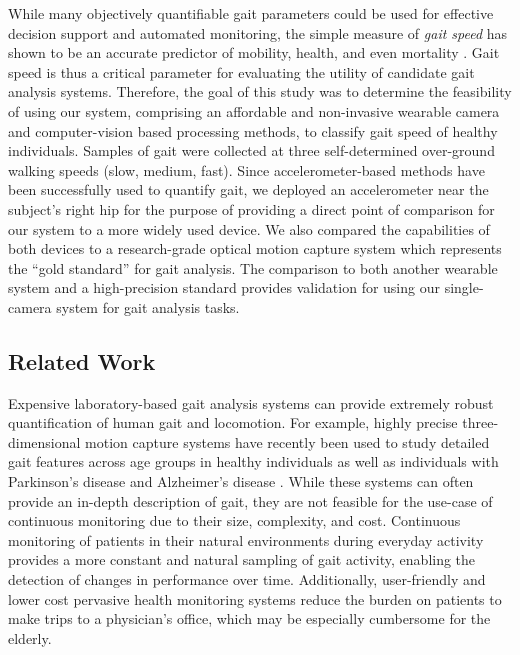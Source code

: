 \documentclass[12pt]{report}
\begin{document}
While many objectively quantifiable gait parameters could be used for effective decision support and automated monitoring, the simple measure of \textit{gait speed} has shown to be an accurate predictor of mobility, health, and even mortality \cite{Afilalo2010GaitSurgery, Viccaro2011GaitForce, Fitzpatrick2007AssociationsPersons}. Gait speed is thus a critical parameter for evaluating the utility of candidate gait analysis systems. Therefore, the goal of this study was to determine the feasibility of using our system, comprising an affordable and non-invasive wearable camera and computer-vision based processing methods, to classify gait speed of healthy individuals. Samples of gait were collected at three self-determined over-ground walking speeds (slow, medium, fast). Since accelerometer-based methods have been successfully used to quantify gait, we deployed an accelerometer near the subject's right hip for the purpose of providing a direct point of comparison for our system to a more widely used device. We also compared the capabilities of both devices to a research-grade optical motion capture system which represents the ``gold standard'' for gait analysis. The comparison to both another wearable system and a high-precision standard provides validation for using our single-camera system for gait analysis tasks.

\subsection{Related Work}
Expensive laboratory-based gait analysis systems can provide extremely robust quantification of human gait and locomotion. For example, highly precise three-dimensional motion capture systems have recently been used to study detailed gait features across age groups in healthy individuals \cite{Chien2015TheIndividuals} as well as individuals with Parkinson's disease \cite{Corona2016QuantitativeDisease} and Alzheimer's disease \cite{Rucco2017Spatio-temporalCapture}. While these systems can often provide an in-depth description of gait, they are not feasible for the use-case of continuous monitoring due to their size, complexity, and cost. Continuous monitoring of patients in their natural environments during everyday activity provides a more constant and natural sampling of gait activity, enabling the detection of changes in performance over time. Additionally, user-friendly and lower cost pervasive health monitoring systems reduce the burden on patients to make trips to a physician's office, which may be especially cumbersome for the elderly.
\end{document}
